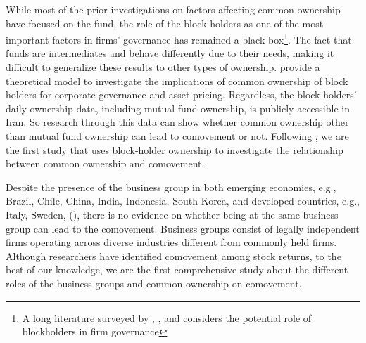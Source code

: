 While most of the prior investigations on factors affecting common-ownership have focused on the fund, the role of the block-holders as one of the most important factors in firms' governance has remained a black box\footnote{A long literature surveyed by \cite{holderness2003survey}, \cite{edmans2014blockholders}, and \cite{edmans2017blockholders} considers the potential role of blockholders in firm governance}. 
The fact that funds are intermediates and behave differently due to their needs, making it difficult to generalize these results to other types of ownership.  \cite{edmans2014governance} provide a theoretical model to investigate the implications of common ownership of block holders for corporate governance and asset pricing.  Regardless, the block holders' daily ownership data, including mutual fund ownership, is publicly accessible in Iran. So research through this data can show whether common ownership other than mutual fund ownership can lead to comovement or not. Following \cite{AntonPolk}, we are the first study that uses block-holder ownership to investigate the relationship between common ownership and comovement.  
	
	

Despite the presence of the business group in both emerging economies, e.g., Brazil, Chile, China, India, Indonesia, South Korea, and developed countries, e.g., Italy, Sweden, (\cite{khanna2007business}), there is no evidence on whether being at the same business group can lead to the comovement.  Business groups consist of legally independent firms operating across diverse industries different from commonly held firms. Although researchers have identified comovement among stock
returns,  to the best of our knowledge, we are the first comprehensive study about the different roles of the business groups and common ownership on comovement. 


